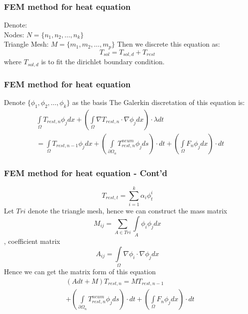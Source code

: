 \documentclass{beamer}
\begin{document}
\begin{frame}
    \frametitle{FEM method for heat equation}
    Denote:\\
    Nodes: $N = \{n_1, n_2,\ldots, n_k\}$\\
    Triangle Mesh: $M = \{m_1, m_2,\ldots,  m_p\}$
    Then we discrete this equation as:
    $$T_{sol} = T_{sol, d} + T_{rest}$$
    where $T_{sol, d}$ is to fit the dirichlet boundary condition.
\end{frame}

\begin{frame}
    \frametitle{FEM method for heat equation}
    Denote $\{\phi_1, \phi_2, \ldots, \phi_k\}$ as the basis
    The Galerkin discretation of this equation is:
    \begin{equation}\nonumber
    \begin{aligned}
        & \int\limits_\Omega T_{rest, n} \phi_j dx+(\int\limits_\Omega \nabla T_{rest, n} \cdot \nabla \phi_j dx) \cdot \lambda dt \\
        & = \int\limits_\Omega T_{rest, n-1}\phi_j dx+(\int\limits_{\partial\Omega_n} T_{rest, n}^{neum} \phi_jds)\cdot dt+(\int\limits_\Omega F_n \phi_j dx)\cdot dt
    \end{aligned}
    \end{equation}
\end{frame}

\begin{frame}
    \frametitle{FEM method for heat equation - Cont'd}
    $$T_{rest, t} = \sum_{i=1}^{k}\alpha_i\phi^{i}_{t}$$
    Let $Tri$ denote the triangle mesh, hence we can construct the mass matrix
    $$M_{ij} = \sum\limits_{A\in Tri} \int\limits_A \phi_i  \phi_j dx$$, 
    coefficient matrix 
    $$A_{ij} = \int\limits_\Omega\nabla \phi_i \cdot \nabla \phi_j dx$$
    Hence we can get the matrix form of this equation
    \begin{equation}\nonumber
    \begin{aligned}
    & (Adt+M)T_{rest,n} = MT_{rest,n-1} \\
    & +(\int\limits_{\partial\Omega_n} T_{rest, n}^{neum} \phi_jds)\cdot dt+(\int\limits_\Omega F_n \phi_j dx)\cdot dt
    \end{aligned}
    \end{equation}
\end{frame}
\end{document}
